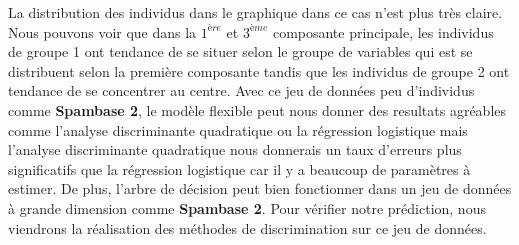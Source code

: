 \documentclass[a4paper,11pt,oneside,roman]{article}
\begin{document}
\newline
La distribution des individus dans le graphique dans ce cas n'est plus très claire. Nous pouvons voir que dans la $1^{ère}$ et $3^{ème}$ composante principale, les individus de groupe 1 ont tendance de se situer selon le groupe de variables qui est se distribuent selon la première composante tandis que les individus de groupe 2 ont tendance de se concentrer au centre. Avec ce jeu de données peu d'individus comme \textbf{Spambase 2}, le modèle flexible peut nous donner des resultats agréables comme l'analyse discriminante quadratique ou la régression logistique mais l'analyse discriminante quadratique nous donnerais un taux d'erreurs plus significatifs que la régression logistique car il y a beaucoup de paramètres à estimer. De plus, l'arbre de décision peut bien fonctionner dans un jeu de données à grande dimension comme \textbf{Spambase 2}. Pour vérifier notre prédiction, nous viendrons la réalisation des méthodes de discrimination sur ce jeu de données. 
\end{document}
